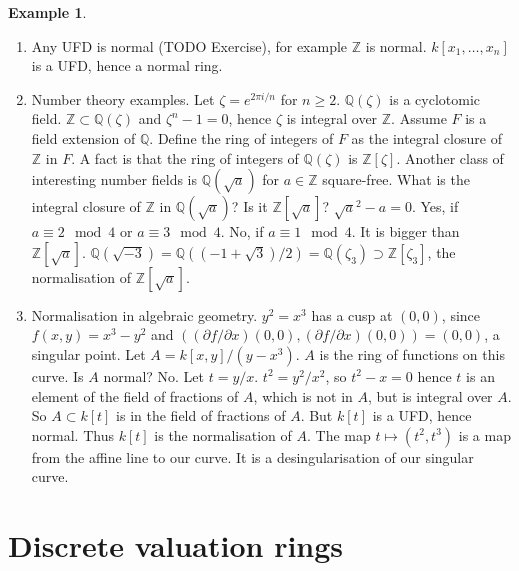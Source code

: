 \documentclass{article}
\newcommand{\Z}{\mathbb{Z}}
\newcommand{\Q}{\mathbb{Q}}
\newcommand{\rb}[1]{\left( #1 \right)}
\renewcommand{\sb}[1]{\left[ #1 \right]}
\theoremstyle{definition}\newtheorem{definition}{Definition}[section]
\theoremstyle{definition}\newtheorem{remark}[definition]{Remark}
\theoremstyle{definition}\newtheorem*{example}{Example}
\theoremstyle{definition}\newtheorem*{note}{Note}
\begin{document}
\begin{example}
\hfill
\begin{enumerate}
\item Any UFD is normal (TODO Exercise), for example $ \Z $ is normal. $ k\sb{x_1, \dots, x_n} $ is a UFD, hence a normal ring.
\item Number theory examples. Let $ \zeta = e^{2\pi i / n} $ for $ n \ge 2 $. $ \Q\rb{\zeta} $ is a cyclotomic field. $ \Z \subset \Q\rb{\zeta} $ and $ \zeta^n - 1 = 0 $, hence $ \zeta $ is integral over $ \Z $. Assume $ F $ is a field extension of $ \Q $. Define the ring of integers of $ F $ as the integral closure of $ \Z $ in $ F $. A fact is that the ring of integers of $ \Q\rb{\zeta} $ is $ \Z\sb{\zeta} $. Another class of interesting number fields is $ \Q\rb{\sqrt{a}} $ for $ a \in \Z $ square-free. What is the integral closure of $ \Z $ in $ \Q\rb{\sqrt{a}} $? Is it $ \Z\sb{\sqrt{a}} $? $ \sqrt{a}^2 - a = 0 $. Yes, if $ a \equiv 2 \mod 4 $ or $ a \equiv 3 \mod 4 $. No, if $ a \equiv 1 \mod 4 $. It is bigger than $ \Z\sb{\sqrt{a}} $. $ \Q\rb{\sqrt{-3}} = \Q\rb{\rb{-1 + \sqrt{3}} / 2} = \Q\rb{\zeta_3} \supset \Z\sb{\zeta_3} $, the normalisation of $ \Z\sb{\sqrt{a}} $.
\item Normalisation in algebraic geometry. $ y^2 = x^3 $ has a cusp at $ \rb{0, 0} $, since $ f\rb{x, y} = x^3 - y^2 $ and $ \rb{\rb{\partial f / \partial x}\rb{0, 0}, \rb{\partial f / \partial x}\rb{0, 0}} = \rb{0, 0} $, a singular point. Let $ A = k\sb{x, y} / \rb{y - x^3} $. $ A $ is the ring of functions on this curve. Is $ A $ normal? No. Let $ t = y / x $. $ t^2 = y^2 / x^2 $, so $ t^2 - x = 0 $ hence $ t $ is an element of the field of fractions of $ A $, which is not in $ A $, but is integral over $ A $. So $ A \subset k\sb{t} $ is in the field of fractions of $ A $. But $ k\sb{t} $ is a UFD, hence normal. Thus $ k\sb{t} $ is the normalisation of $ A $. The map $ t \mapsto \rb{t^2, t^3} $ is a map from the affine line to our curve. It is a desingularisation of our singular curve.
\end{enumerate}
\end{example}


\section{Discrete valuation rings}
\end{document}
